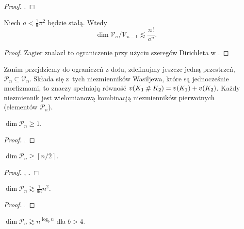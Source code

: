 \begin{proof}
    \cite{bollobas00}.
\end{proof}

\begin{proposition}
    Niech $a < \frac 1 6 \pi^2$ będzie stałą.
    Wtedy
    \begin{equation}
        \dim \mathcal V_n / \mathcal V_{n-1} \lesssim \frac{n!}{a^n}.
    \end{equation}
\end{proposition}

\begin{proof}
    Zagier znalazł to ograniczenie przy użyciu szeregów Dirichleta w \cite{zagier01}.
\end{proof}

Zanim przejdziemy do ograniczeń z dołu, zdefinujmy jeszcze jedną przestrzeń, $\mathcal P_n \subseteq \mathcal V_n$.
Składa się z~tych niezmienników Wasiljewa, które są jednocześnie morfizmami, to znaczy spełniają równość $v(K_1 \mathbin{\#} K_2) = v(K_1) + v(K_2)$.
Każdy niezmiennik jest wielomianową kombinacją niezmienników pierwotnych (elementów $\mathcal P_n$).

\begin{proposition}
    $\dim \mathcal P_n \ge 1$.
\end{proposition}

\begin{proof}
    \cite{duzhin94}.
\end{proof}

\begin{proposition}
    $\dim \mathcal P_n \ge [n/2]$.
\end{proposition}

\begin{proof}
    \cite{melvin95}, \cite{varchenko97}.
\end{proof}

\begin{proposition}
    $\dim \mathcal P_n \gtrsim \frac{1}{96} n^2$.
\end{proposition}

\begin{proof}
    \cite{duzhin96}.
\end{proof}

\begin{proposition}
    $\dim \mathcal P_n \gtrsim n^{\log_b n}$ dla $b > 4$.
\end{proposition}

